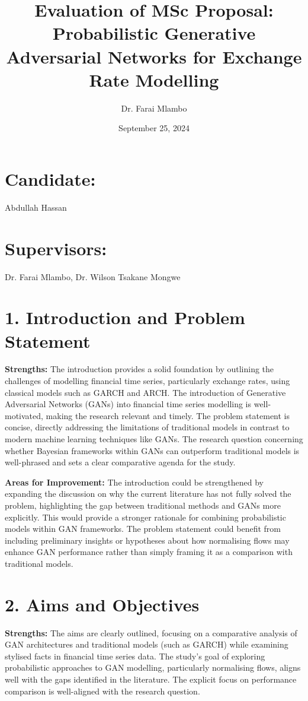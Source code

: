 \documentclass[a4paper,12pt]{article}
\title{Evaluation of MSc Proposal: Probabilistic Generative Adversarial Networks for Exchange Rate Modelling}
\author{Dr. Farai Mlambo}
\date{September 25, 2024}
\begin{document}
\maketitle

\section*{Candidate:}
Abdullah Hassan

\section*{Supervisors:}
Dr. Farai Mlambo, Dr. Wilson Tsakane Mongwe

\section*{1. Introduction and Problem Statement}

\textbf{Strengths:}  
The introduction provides a solid foundation by outlining the challenges of modelling financial time series, particularly exchange rates, using classical models such as GARCH and ARCH. The introduction of Generative Adversarial Networks (GANs) into financial time series modelling is well-motivated, making the research relevant and timely. The problem statement is concise, directly addressing the limitations of traditional models in contrast to modern machine learning techniques like GANs. The research question concerning whether Bayesian frameworks within GANs can outperform traditional models is well-phrased and sets a clear comparative agenda for the study.

\textbf{Areas for Improvement:}  
The introduction could be strengthened by expanding the discussion on why the current literature has not fully solved the problem, highlighting the gap between traditional methods and GANs more explicitly. This would provide a stronger rationale for combining probabilistic models within GAN frameworks. The problem statement could benefit from including preliminary insights or hypotheses about how normalising flows may enhance GAN performance rather than simply framing it as a comparison with traditional models.

\section*{2. Aims and Objectives}

\textbf{Strengths:}  
The aims are clearly outlined, focusing on a comparative analysis of GAN architectures and traditional models (such as GARCH) while examining stylised facts in financial time series data. The study’s goal of exploring probabilistic approaches to GAN modelling, particularly normalising flows, aligns well with the gaps identified in the literature. The explicit focus on performance comparison is well-aligned with the research question.
\end{document}
